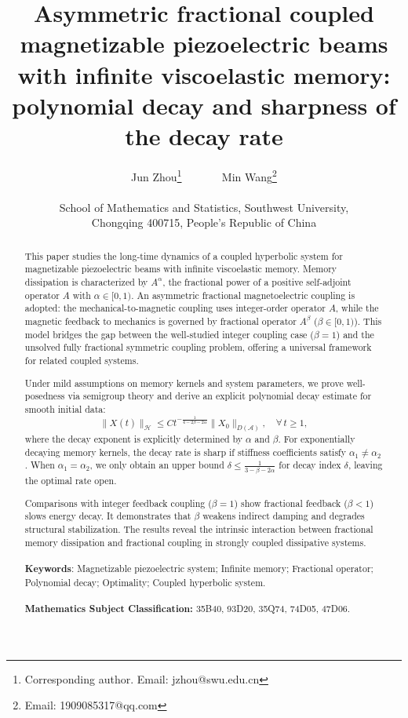 \documentclass[12pt,reqno]{article}
\title{Asymmetric fractional coupled magnetizable piezoelectric beams with infinite viscoelastic memory: polynomial decay and sharpness of the decay rate}
\author{Jun Zhou\footnote{Corresponding author. Email: jzhou@swu.edu.cn} ~~~~~~ Min Wang\footnote{Email: 1909085317@qq.com}\\\\{School of Mathematics and Statistics, Southwest University},\\
	{Chongqing 400715, People's Republic of China}}
\date{}
\begin{document}
	\maketitle
	\begin{abstract}
		This paper studies the long-time dynamics of a coupled hyperbolic system for magnetizable piezoelectric beams with infinite viscoelastic memory. Memory dissipation is characterized by $A^\alpha$, the fractional power of a positive self-adjoint operator $A$ with $\alpha\in[0,1)$. An asymmetric fractional magnetoelectric coupling is adopted: the mechanical-to-magnetic coupling uses integer-order operator $A$, while the magnetic feedback to mechanics is governed by fractional operator $A^\beta$ ($\beta\in[0,1)$). This model bridges the gap between the well-studied integer coupling case ($\beta=1$) and the unsolved fully fractional symmetric coupling problem, offering a universal framework for related coupled systems.

Under mild assumptions on memory kernels and system parameters, we prove well-posedness via semigroup theory and derive an explicit polynomial decay estimate for smooth initial data:
\[
\|X(t)\|_{\mathcal H} \le C t^{-\frac{1}{4-2\beta-2\alpha}}\|X_0\|_{D(\mathcal A)},\quad \forall\,t\ge 1,
\]
where the decay exponent is explicitly determined by $\alpha$ and $\beta$. For exponentially decaying memory kernels, the decay rate is sharp if stiffness coefficients satisfy $\alpha_1\ne\alpha_2$. When $\alpha_1=\alpha_2$, we only obtain an upper bound $\delta\le \frac{1}{3-\beta-2\alpha}$ for decay index $\delta$, leaving the optimal rate open.

Comparisons with integer feedback coupling ($\beta=1$) show fractional feedback ($\beta<1$) slows energy decay. It demonstrates that $\beta$ weakens indirect damping and degrades structural stabilization. The results reveal the intrinsic interaction between fractional memory dissipation and fractional coupling in strongly coupled dissipative systems.
		\\\\
		\textbf{Keywords}: Magnetizable piezoelectric system; Infinite memory; Fractional operator; Polynomial decay; Optimality; Coupled hyperbolic system.     \\\\
\noindent \textbf{Mathematics Subject Classification:} 35B40, 93D20, 35Q74, 74D05, 47D06.
	\end{abstract}
\end{document}
